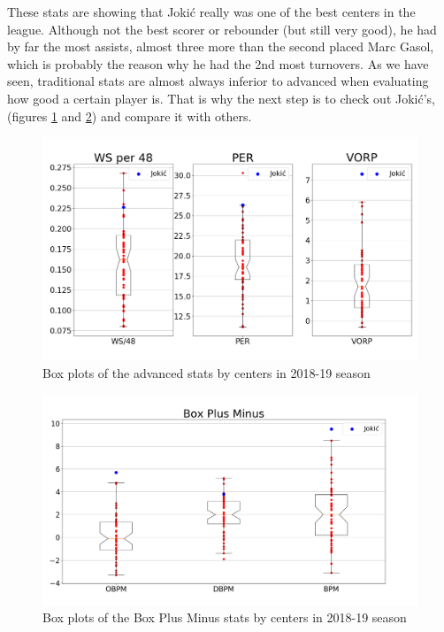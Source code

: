 \documentclass[a4paper]{article}
\begin{document}
These stats are showing that Joki\' c really was one of the best centers in the league. Although not the best scorer or rebounder (but still very good), he had by far the most assists, almost three more than the second placed Marc Gasol, which is probably the reason why he had the 2nd most turnovers. As we have seen, traditional stats are almost always inferior to advanced when evaluating how good a certain player is. That is why the next step is to check out Joki\' c's, (figures \ref{plt:centers_adv} and \ref{plt:centers_bpm}) and compare it with others.

\begin{figure}[h!]
\begin{center}
\includegraphics[scale=0.30]{centers_advanced.png}
\end{center}
\caption{Box plots of the advanced stats by centers in 2018-19 season}
\label{plt:centers_adv}
\end{figure}

\begin{figure}[h!]
\begin{center}
\includegraphics[scale=0.30]{centers_bpm.png}
\end{center}
\caption{Box plots of the Box Plus Minus stats by centers in 2018-19 season}
\label{plt:centers_bpm}
\end{figure}
\end{document}
